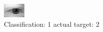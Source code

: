 \begin{figure}[h!]
\begin{center}
\includegraphics[width=0.60\columnwidth]{figures/ID391_class_1_target_2.png}
\end{center}
\caption{ Classification: 1 actual target: 2}
\label{fig:ID391_class_1_target_2}
\end{figure}
